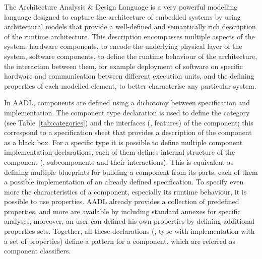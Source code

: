 The Architecture Analysis \& Design Language is a very powerful modelling language designed to capture the architecture of embedded systems by using architectural models that provide a well-defined and semantically rich description of the runtime architecture. This description encompasses multiple aspects of the system: hardware components, to encode the underlying physical layer of the system, software components, to define the runtime behaviour of the architecture, the interaction between them, for example deployment of software on specific hardware and communication between different execution units, and the defining properties of each modelled element, to better characterise any particular system.

In AADL, components are defined using a dichotomy between specification and implementation. The component type declaration is used to define the category (see Table~\ref{tab:categories}) and the interfaces (\ie, features) of the component; this correspond to a specification sheet that provides a description of the component as a black box. For a specific type it is possible to define multiple component implementation declarations, each of them defines internal structure of the component (\ie, subcomponents and their interactions). This is equivalent as defining multiple blueprints for building a component from its parts, each of them a possible implementation of an already defined specification. To specify even more the characteristics of a component, especially its runtime behaviour, it is possible to use properties. AADL already provides a collection of predefined properties, and more are available by including standard annexes for specific analyses, moreover, an user can defined his own properties by defining additional properties sets. Together, all these declarations (\ie, type with implementation with a set of properties) define a pattern for a component, which are referred as component classifiers.
 
